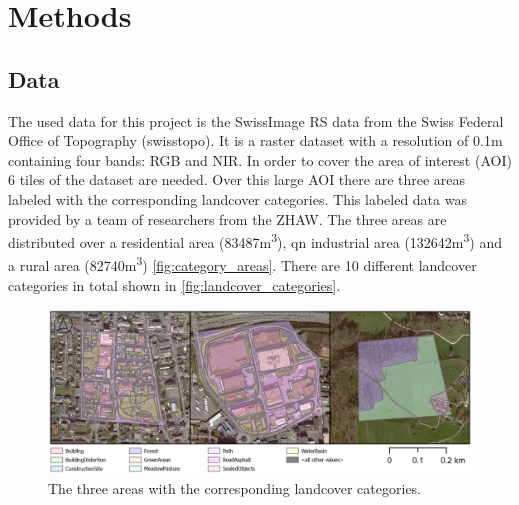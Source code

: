

\section{Methods}
\label{methods}

\subsection{Data}%

The used data for this project is the SwissImage RS data from the Swiss Federal Office of Topography (swisstopo).
It is a raster dataset with a resolution of 0.1m containing four bands: RGB and NIR.
In order to cover the area of interest (AOI) 6 tiles of the dataset are needed.
Over this large AOI there are three areas labeled with the corresponding landcover categories.
This labeled data was provided by a team of researchers from the ZHAW. The three
areas are distributed over a residential area (83487m\textsuperscript{3}),
qn industrial area (132642m\textsuperscript{3}) and a rural area (82740m\textsuperscript{3}) \autoref{fig:category_areas}.
There are 10 different landcover categories in total shown in \autoref{fig:landcover_categories}.

\begin{figure}[H]
    \centering
    \captionsetup{width=0.8\linewidth}
    \includegraphics[width=\linewidth]{figures/category_areas.png}
    \caption{The three areas with the corresponding landcover categories.}
    \label{fig:category_areas}
\end{figure}

